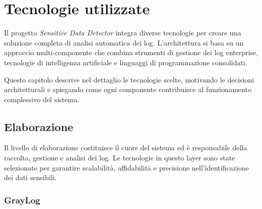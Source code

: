 \documentclass[12pt]{report}
\begin{document}




%
%







%
%

\chapter{Tecnologie utilizzate}
\label{chap:tecnologie_utilizzate}

Il progetto \textit{Sensitive Data Detector} integra diverse tecnologie per creare una soluzione completa di analisi automatica dei log. L'architettura si basa su un approccio multi-componente che combina strumenti di gestione dei log enterprise, tecnologie di intelligenza artificiale e linguaggi di programmazione consolidati.

Questo capitolo descrive nel dettaglio le tecnologie scelte, motivando le decisioni architetturali e spiegando come ogni componente contribuisce al funzionamento complessivo del sistema.

\section{Elaborazione}
\label{sec:elaborazione}

Il livello di elaborazione costituisce il cuore del sistema ed è responsabile della raccolta, gestione e analisi dei log. Le tecnologie in questo layer sono state selezionate per garantire scalabilità, affidabilità e precisione nell'identificazione dei dati sensibili.

\subsection{GrayLog}
\label{subsec:graylog}
\end{document}
